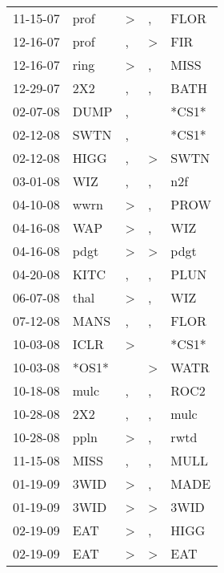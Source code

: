 \begin{supertabular}{lllll}
 11-15-07 &   prof &     \textgreater &                , &   FLOR \\
 12-16-07 &   prof &                , &     \textgreater &    FIR \\
 12-16-07 &   ring &     \textgreater &                , &   MISS \\
 12-29-07 &    2X2 &                , &                , &   BATH \\
 02-07-08 &   DUMP &                , &                  &  *CS1* \\
 02-12-08 &   SWTN &                , &                  &  *CS1* \\
 02-12-08 &   HIGG &                , &     \textgreater &   SWTN \\
 03-01-08 &    WIZ &                , &                , &    n2f \\
 04-10-08 &   wwrn &     \textgreater &                , &   PROW \\
 04-16-08 &    WAP &     \textgreater &                , &    WIZ \\
 04-16-08 &   pdgt &     \textgreater &     \textgreater &   pdgt \\
 04-20-08 &   KITC &                , &                , &   PLUN \\
 06-07-08 &   thal &     \textgreater &                , &    WIZ \\
 07-12-08 &   MANS &                , &                , &   FLOR \\
 10-03-08 &   ICLR &     \textgreater &                  &  *CS1* \\
 10-03-08 &  *OS1* &                  &     \textgreater &   WATR \\
 10-18-08 &   mulc &                , &                , &   ROC2 \\
 10-28-08 &    2X2 &                , &                , &   mulc \\
 10-28-08 &   ppln &     \textgreater &                , &   rwtd \\
 11-15-08 &   MISS &                , &                , &   MULL \\
 01-19-09 &   3WID &     \textgreater &                , &   MADE \\
 01-19-09 &   3WID &     \textgreater &     \textgreater &   3WID \\
 02-19-09 &    EAT &     \textgreater &                , &   HIGG \\
 02-19-09 &    EAT &     \textgreater &     \textgreater &    EAT \\

\end{supertabular}
